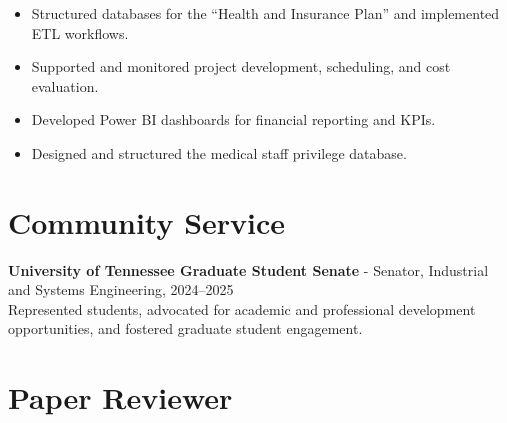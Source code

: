 \documentclass[10pt, letterpaper]{article}
\newenvironment{highlights}{
    \begin{itemize}[
        topsep=0.10 cm,
        parsep=0.10 cm,
        partopsep=0pt,
        itemsep=0pt,
        leftmargin=0 cm + 10pt
    ]
}{
    \end{itemize}
} %
\begin{document}
\begin{highlights}
    \item Structured databases for the “Health and Insurance Plan” and implemented ETL workflows.
    \item Supported and monitored project development, scheduling, and cost evaluation.
    \item Developed Power BI dashboards for financial reporting and KPIs.
    \item Designed and structured the medical staff privilege database.
\end{highlights}






\section*{Community Service}

\textbf{University of Tennessee Graduate Student Senate} - Senator, Industrial and Systems Engineering, 2024–2025\\  

\small
Represented students, advocated for academic and professional development opportunities, and fostered graduate student engagement.




\section*{Paper Reviewer}
\small
\end{document}
